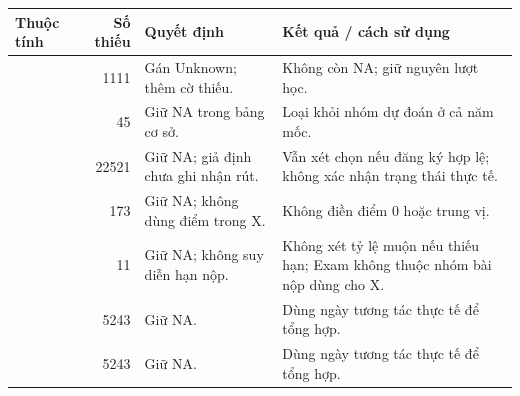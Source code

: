 \begin{tabularx}{\linewidth}{@{}p{.24\linewidth}rp{.27\linewidth}Y@{}}
\toprule
\textbf{Thuộc tính} & \textbf{Số thiếu} & \textbf{Quyết định} & \textbf{Kết quả / cách sử dụng} \\
\midrule
{} & \num{1111} & Gán Unknown; thêm cờ thiếu. & Không còn NA; giữ nguyên lượt học. \\
 & \num{45} & Giữ NA trong bảng cơ sở. & Loại khỏi nhóm dự đoán ở cả năm mốc. \\
 & \num{22521} & Giữ NA; giả định chưa ghi nhận rút. & Vẫn xét chọn nếu đăng ký hợp lệ; không xác nhận trạng thái thực tế. \\
 & \num{173} & Giữ NA; không dùng điểm trong X. & Không điền điểm 0 hoặc trung vị. \\
 & \num{11} & Giữ NA; không suy diễn hạn nộp. & Không xét tỷ lệ muộn nếu thiếu hạn; Exam không thuộc nhóm bài nộp dùng cho X. \\
 & \num{5243} & Giữ NA. & Dùng ngày tương tác thực tế để tổng hợp. \\
 & \num{5243} & Giữ NA. & Dùng ngày tương tác thực tế để tổng hợp. \\
\bottomrule
\end{tabularx}
